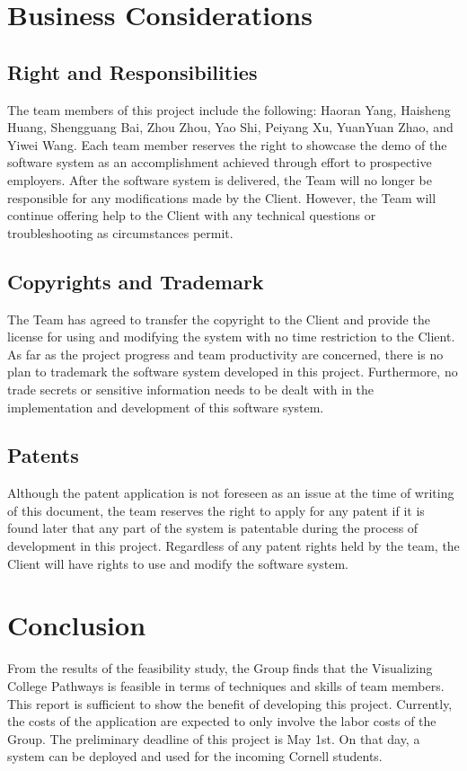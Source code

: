\documentclass{article}
\begin{document}
\section{Business Considerations}
\subsection{Right and Responsibilities}
The team members of this project include the following: Haoran Yang, Haisheng Huang, Shengguang Bai, Zhou Zhou, Yao Shi, Peiyang Xu, YuanYuan Zhao, and Yiwei Wang. Each team member reserves the right to showcase the demo of the software system as an accomplishment achieved through effort to prospective employers. After the software system is delivered, the Team will no longer be responsible for any modifications made by the Client. However, the Team will continue offering help to the Client with any technical questions or troubleshooting as circumstances permit.

\subsection{Copyrights and Trademark}
The Team has agreed to transfer the copyright to the Client and provide the license for using and modifying the system with no time restriction to the Client. As far as the project progress and team productivity are concerned, there is no plan to trademark the software system developed in this project. Furthermore, no trade secrets or sensitive information needs to be dealt with in the implementation and development of this software system.

\subsection{Patents}
Although the patent application is not foreseen as an issue at the time of writing of this document, the team reserves the right to apply for any patent if it is found later that any part of the system is patentable during the process of development in this project. Regardless of any patent rights held by the team, the Client will have rights to use and modify the software system.

\section{Conclusion}
From the results of the feasibility study, the Group finds that the Visualizing College Pathways is feasible in terms of techniques and skills of team members. This report is sufficient to show the benefit of developing this project. Currently, the costs of the application are expected to only involve the labor costs of the Group. The preliminary deadline of this project is May 1st. On that day, a system can be deployed and used for the incoming Cornell students.
\end{document}
